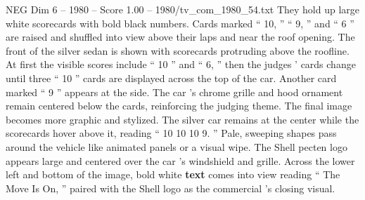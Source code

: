 \begin{textsample}{NEG Dim 6 – 1980 – Score 1.00 – 1980/tv\_com\_1980\_54.txt}
They hold up large white scorecards with bold black numbers.
Cards marked “ 10, ” “ 9, ” and “ 6 ” are raised and shuffled into view above their laps and near the roof opening.
The front of the silver sedan is shown with scorecards protruding above the roofline.
At first the visible scores include “ 10 ” and “ 6, ” then the judges ’ cards change until three “ 10 ” cards are displayed across the top of the car.
Another card marked “ 9 ” appears at the side.
The car ’s chrome grille and hood ornament remain centered below the cards, reinforcing the judging theme.
The final image becomes more graphic and stylized.
The silver car remains at the center while the scorecards hover above it, reading “ 10 10 10 9. ” Pale, sweeping shapes pass around the vehicle like animated panels or a visual wipe.
The Shell pecten logo appears large and centered over the car ’s windshield and grille.
Across the lower left and bottom of the image, bold white \textbf{text} comes into view reading “ The Move Is On, ” paired with the Shell logo as the commercial ’s closing visual.

\end{textsample}
